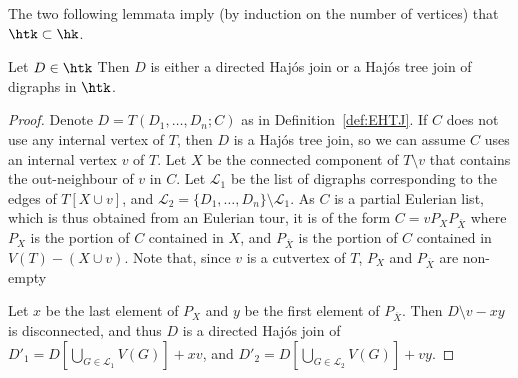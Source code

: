 
The two following lemmata imply (by induction on the number of vertices) that $\htk\subset \hk$.


\begin{lemma}\label{lem:HTK=HJorHT}
Let $D\in \htk$ Then $D$ is either a directed Haj\'os join or a Haj\'os tree join of digraphs in $\htk$.
\end{lemma}
\begin{proof}
Denote $D=T(D_1, \dots, D_n;C)$ as in Definition~\ref{def:EHTJ}. If $C$ does not use any internal vertex of $T$, then $D$ is a Haj\'os tree join, so we can assume $C$ uses an internal vertex $v$ of $T$. Let $X$ be the connected component of $T \setminus v$ that contains the out-neighbour of $v$ in $C$. 
    Let $\mathcal L_1$ be the list of digraphs corresponding to the edges of $T[X \cup v]$, and $\mathcal L_2 = \{D_1, \dots, D_n\}\setminus \mathcal L_1$. As $C$ is a partial Eulerian list, which is thus obtained from an Eulerian tour, it is of the form $C = vP_{X}P_{\overline{X}}$ %
    where $P_X$ is the portion of $C$ contained in $X$, and $P_{\overline X}$ is the portion of $C$ contained in $V(T)-(X\cup v)$. 
    Note that, since $v$ is a cutvertex of $T$, $P_{X}$ and $P_{\overline{X}}$ are non-empty

    Let $x$ be the last element of $P_{X}$ and $y$ be the first element of $P_{\overline{X}}$. Then $D \setminus v - xy$ is disconnected, and thus $D$ is a directed Haj\'os join of %
    $D'_1 = D[\bigcup_{G \in \mathcal L_1} V(G)] + xv$, 
    and $D'_2 = D[\bigcup_{G \in \mathcal L_2} V(G)] + vy$. 


\end{proof}

